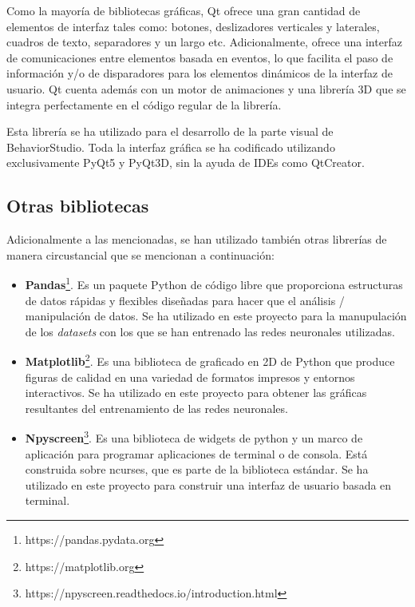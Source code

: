 Como la mayoría de bibliotecas gráficas, Qt ofrece una gran cantidad de elementos de interfaz tales como: botones, deslizadores verticales y laterales, cuadros de texto, separadores y un largo etc. Adicionalmente, ofrece una interfaz de comunicaciones entre elementos basada en eventos, lo que facilita el paso de información y/o de disparadores para los elementos dinámicos de la interfaz de usuario. Qt cuenta además con un motor de animaciones y una librería 3D que se integra perfectamente en el código regular de la librería.

Esta librería se ha utilizado para el desarrollo de la parte visual de BehaviorStudio. Toda la interfaz gráfica se ha codificado utilizando exclusivamente PyQt5 y PyQt3D, sin la ayuda de IDEs como QtCreator.

\subsection{Otras bibliotecas}

Adicionalmente a las mencionadas, se han utilizado también otras librerías de manera circustancial que se mencionan a continuación:

\begin{itemize}
    \item \textbf{Pandas}\footnote{https://pandas.pydata.org}. Es un paquete Python de código libre que proporciona estructuras de datos rápidas y flexibles diseñadas para hacer que el  análisis / manipulación de datos. Se ha utilizado en este proyecto para la manupulación de los \textit{datasets} con los que se han entrenado las redes neuronales utilizadas.
    \item \textbf{Matplotlib}\footnote{https://matplotlib.org}. Es una biblioteca de graficado en 2D de Python que produce figuras de calidad en una variedad de formatos impresos y entornos interactivos. Se ha utilizado en este proyecto para obtener las gráficas resultantes del entrenamiento de las redes neuronales.
    \item \textbf{Npyscreen}\footnote{https://npyscreen.readthedocs.io/introduction.html}. Es una biblioteca de widgets de python y un marco de aplicación para programar aplicaciones de terminal o de consola. Está construida sobre ncurses, que es parte de la biblioteca estándar. Se ha utilizado en este proyecto para construir una interfaz de usuario basada en terminal.
\end{itemize}

